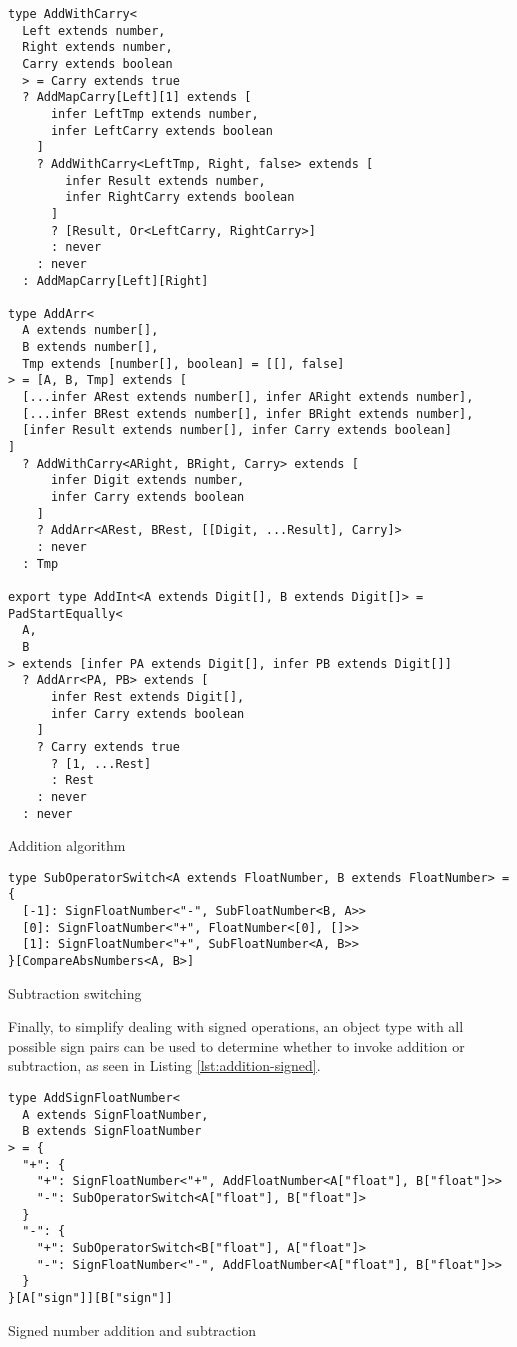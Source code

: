 \begin{listing}[ht!]
  \begin{verbatim}
type AddWithCarry<
  Left extends number,
  Right extends number,
  Carry extends boolean
  > = Carry extends true
  ? AddMapCarry[Left][1] extends [
      infer LeftTmp extends number,
      infer LeftCarry extends boolean
    ]
    ? AddWithCarry<LeftTmp, Right, false> extends [
        infer Result extends number,
        infer RightCarry extends boolean
      ]
      ? [Result, Or<LeftCarry, RightCarry>]
      : never
    : never
  : AddMapCarry[Left][Right]

type AddArr<
  A extends number[],
  B extends number[],
  Tmp extends [number[], boolean] = [[], false]
> = [A, B, Tmp] extends [
  [...infer ARest extends number[], infer ARight extends number],
  [...infer BRest extends number[], infer BRight extends number],
  [infer Result extends number[], infer Carry extends boolean]
]
  ? AddWithCarry<ARight, BRight, Carry> extends [
      infer Digit extends number,
      infer Carry extends boolean
    ]
    ? AddArr<ARest, BRest, [[Digit, ...Result], Carry]>
    : never
  : Tmp

export type AddInt<A extends Digit[], B extends Digit[]> = PadStartEqually<
  A,
  B
> extends [infer PA extends Digit[], infer PB extends Digit[]]
  ? AddArr<PA, PB> extends [
      infer Rest extends Digit[],
      infer Carry extends boolean
    ]
    ? Carry extends true
      ? [1, ...Rest]
      : Rest
    : never
  : never
\end{verbatim}
  \caption{Addition algorithm}\label{lst:addition-algorithm}
\end{listing}

\begin{listing}[ht!]
  \begin{verbatim}
type SubOperatorSwitch<A extends FloatNumber, B extends FloatNumber> = {
  [-1]: SignFloatNumber<"-", SubFloatNumber<B, A>>
  [0]: SignFloatNumber<"+", FloatNumber<[0], []>>
  [1]: SignFloatNumber<"+", SubFloatNumber<A, B>>
}[CompareAbsNumbers<A, B>]
\end{verbatim}
  \caption{Subtraction switching}\label{lst:subtractor-switching}
\end{listing}

Finally, to simplify dealing with signed operations, an object type with all possible sign pairs can be used to determine whether to invoke addition or subtraction, as seen in Listing \ref{lst:addition-signed}.

\begin{listing}[ht]
  \begin{verbatim}
type AddSignFloatNumber<
  A extends SignFloatNumber,
  B extends SignFloatNumber
> = {
  "+": {
    "+": SignFloatNumber<"+", AddFloatNumber<A["float"], B["float"]>>
    "-": SubOperatorSwitch<A["float"], B["float"]>
  }
  "-": {
    "+": SubOperatorSwitch<B["float"], A["float"]>
    "-": SignFloatNumber<"-", AddFloatNumber<A["float"], B["float"]>>
  }
}[A["sign"]][B["sign"]]
\end{verbatim}
  \caption{Signed number addition and subtraction}\label{lst:addition-signed}
\end{listing}

